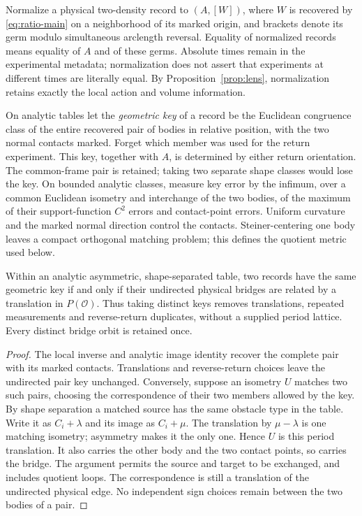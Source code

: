 \begin{definition}\label{def:record-key}
Normalize a physical two-density record to $(A,[W])$, where $W$ is
recovered by \eqref{eq:ratio-main} on a neighborhood of its marked
origin, and brackets denote its germ modulo simultaneous arclength
reversal. Equality of normalized records means equality of $A$ and
of these germs. Absolute times remain in the experimental metadata;
normalization does not assert that experiments at different times are
literally equal. By Proposition~\ref{prop:lens}, normalization retains
exactly the local action and volume information.

On analytic tables let the \emph{geometric key} of a record be the
Euclidean congruence class of the entire recovered pair of bodies in
relative position, with the two normal contacts marked. Forget which
member was used for the return experiment. This key, together with $A$,
is determined by either return orientation. The common-frame pair is
retained; taking two separate shape classes would lose the key.
On bounded analytic classes, measure key error by the infimum, over a
common Euclidean isometry and interchange of the two bodies, of the
maximum of their support-function $C^2$ errors and contact-point errors.
Uniform curvature and the marked normal direction control the contacts.
Steiner-centering one body leaves a compact orthogonal matching problem;
this defines the quotient metric used below.
\end{definition}

\begin{lemma}
\label{lem:orbit-key}
Within an analytic asymmetric, shape-separated table, two records have
the same geometric key if and only if their undirected physical bridges
are related by a translation in $P(\mathcal O)$. Thus taking distinct
keys removes translations, repeated measurements and reverse-return
duplicates, without a supplied period lattice. Every distinct bridge
orbit is retained once.
\end{lemma}
\begin{proof}
The local inverse and analytic image identity recover the complete pair
with its marked contacts. Translations and reverse-return choices leave
the undirected pair key unchanged. Conversely, suppose an isometry $U$
matches two such pairs, choosing the correspondence of their two members
allowed by the key. By shape separation a matched source has the same
obstacle type in the table. Write it as $C_i+\lambda$ and its image as
$C_i+\mu$. The translation by $\mu-\lambda$ is one matching isometry;
asymmetry makes it the only one. Hence $U$ is this period translation.
It also carries the other body and the two contact points, so carries
the bridge. The argument permits the source and target to be exchanged,
and includes quotient loops. The correspondence is still a translation
of the undirected physical edge. No independent sign choices remain
between the two bodies of a pair.
\end{proof}


